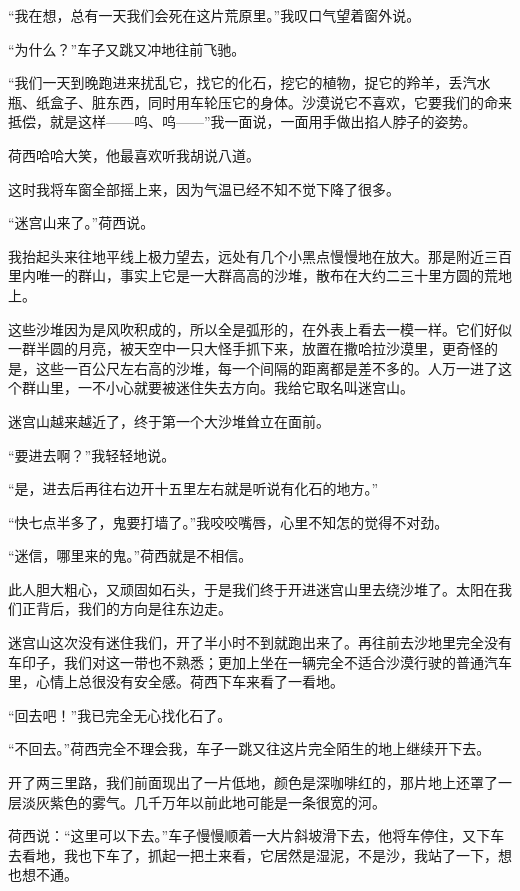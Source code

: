 \par “我在想，总有一天我们会死在这片荒原里。”我叹口气望着窗外说。
\par “为什么？”车子又跳又冲地往前飞驰。
\par “我们一天到晚跑进来扰乱它，找它的化石，挖它的植物，捉它的羚羊，丢汽水瓶、纸盒子、脏东西，同时用车轮压它的身体。沙漠说它不喜欢，它要我们的命来抵偿，就是这样——呜、呜——”我一面说，一面用手做出掐人脖子的姿势。
\par 荷西哈哈大笑，他最喜欢听我胡说八道。
\par 这时我将车窗全部摇上来，因为气温已经不知不觉下降了很多。
\par “迷宫山来了。”荷西说。
\par 我抬起头来往地平线上极力望去，远处有几个小黑点慢慢地在放大。那是附近三百里内唯一的群山，事实上它是一大群高高的沙堆，散布在大约二三十里方圆的荒地上。
\par 这些沙堆因为是风吹积成的，所以全是弧形的，在外表上看去一模一样。它们好似一群半圆的月亮，被天空中一只大怪手抓下来，放置在撒哈拉沙漠里，更奇怪的是，这些一百公尺左右高的沙堆，每一个间隔的距离都是差不多的。人万一进了这个群山里，一不小心就要被迷住失去方向。我给它取名叫迷宫山。
\par 迷宫山越来越近了，终于第一个大沙堆耸立在面前。
\par “要进去啊？”我轻轻地说。
\par “是，进去后再往右边开十五里左右就是听说有化石的地方。”
\par “快七点半多了，鬼要打墙了。”我咬咬嘴唇，心里不知怎的觉得不对劲。
\par “迷信，哪里来的鬼。”荷西就是不相信。
\par 此人胆大粗心，又顽固如石头，于是我们终于开进迷宫山里去绕沙堆了。太阳在我们正背后，我们的方向是往东边走。
\par 迷宫山这次没有迷住我们，开了半小时不到就跑出来了。再往前去沙地里完全没有车印子，我们对这一带也不熟悉；更加上坐在一辆完全不适合沙漠行驶的普通汽车里，心情上总很没有安全感。荷西下车来看了一看地。
\par “回去吧！”我已完全无心找化石了。
\par “不回去。”荷西完全不理会我，车子一跳又往这片完全陌生的地上继续开下去。
\par 开了两三里路，我们前面现出了一片低地，颜色是深咖啡红的，那片地上还罩了一层淡灰紫色的雾气。几千万年以前此地可能是一条很宽的河。
\par 荷西说：“这里可以下去。”车子慢慢顺着一大片斜坡滑下去，他将车停住，又下车去看地，我也下车了，抓起一把土来看，它居然是湿泥，不是沙，我站了一下，想也想不通。
